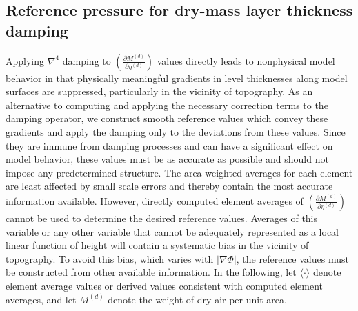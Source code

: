 \documentclass{agujournal}
\begin{document}
{\subsection{Reference pressure for dry-mass layer thickness damping}\label{app:ref_dp}
Applying $\nabla^4$ damping to $\left( \frac{\partial M^{(d)}}{\partial \eta^{(d)}}\right)$ values directly leads to nonphysical model behavior in that physically meaningful gradients in level thicknesses along model surfaces are suppressed, particularly in the vicinity of topography. As an alternative to computing and applying the necessary correction terms to the damping operator, we construct smooth reference values which convey these gradients and apply the damping only to the deviations from these values. Since they are immune from damping processes and can have a significant effect on model behavior, these values must be as accurate as possible and should not impose any predetermined structure. The area weighted averages for each element are least affected by small scale errors and thereby contain the most accurate information available. However, directly computed element averages of $\left( \frac{\partial M^{(d)}}{\partial \eta^{(d)}}\right)$ cannot be used to determine the desired reference values. Averages of this variable or any other variable that cannot be adequately represented as a local linear function of height will contain a systematic bias in the vicinity of topography. To avoid this bias, which varies with $\left| \nabla \Phi\right|$, the reference values must be constructed from other available information. In the following, let $\langle \cdot \rangle$ denote element average values or derived values consistent with computed element averages, and let $M^{(d)}$ denote the weight of dry air per unit area.

}
\end{document}
